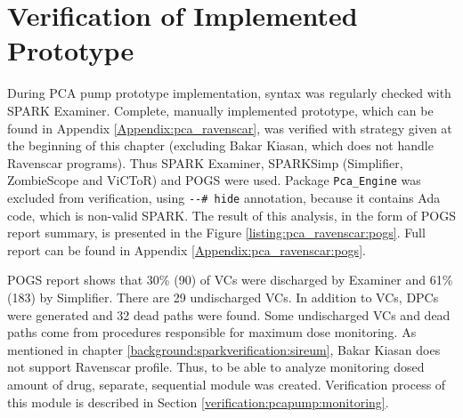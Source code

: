 \section{Verification of Implemented Prototype}
\label{verification:prototype}

During PCA pump prototype implementation, syntax was regularly checked with SPARK Examiner. Complete, manually implemented prototype, which can be found in Appendix \ref{Appendix:pca_ravenscar}, was verified with strategy given at the beginning of this chapter (excluding Bakar Kiasan, which does not handle Ravenscar programs). Thus SPARK Examiner, SPARKSimp (Simplifier, ZombieScope and ViCToR) and POGS were used. Package \lstinline{Pca_Engine} was excluded from verification, using \lstinline{--# hide} annotation, because it contains Ada code, which is non-valid SPARK. The result of this analysis, in the form of POGS report summary, is presented in the Figure \ref{listing:pca_ravenscar:pogs}. Full report can be found in Appendix \ref{Appendix:pca_ravenscar:pogs}.

POGS report shows that 30\% (90) of VCs were discharged by Examiner and 61\% (183) by Simplifier. There are 29 undischarged VCs. In addition to VCs, DPCs were generated and 32 dead paths were found. Some undischarged VCs and dead paths come from procedures responsible for maximum dose monitoring. As mentioned in chapter \ref{background:sparkverification:sireum}, Bakar Kiasan does not support Ravenscar profile. Thus, to be able to analyze monitoring dosed amount of drug, separate, sequential module was created. Verification process of this module is described in Section \ref{verification:pcapump:monitoring}.

